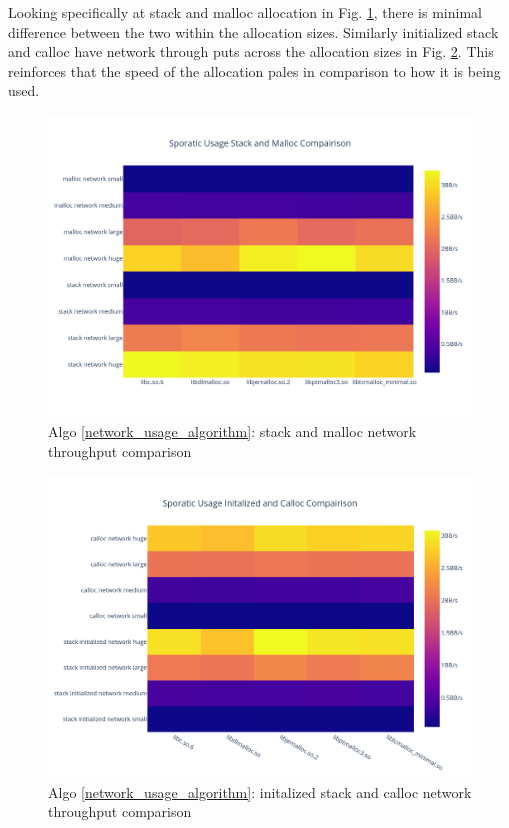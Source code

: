 \documentclass[letterpaper, 10 pt, conference]{ieeeconf}  %
\begin{document}
\pagebreak
Looking specifically at stack and malloc allocation in Fig. \ref{algo3_stack_malloc_hist}, there is minimal difference between the two within the allocation sizes.
Similarly initialized stack and calloc have network through puts across the allocation sizes in Fig. \ref{algo3_init_calloc_hist}.
This reinforces that the speed of the allocation pales in comparison to how it is being used.

\begin{figure}[tbh!]
  \centering
  \includegraphics[width=\columnwidth]{graphs/sporatic_stack_malloc_hist.png}
  \caption{ Algo \ref{network_usage_algorithm}: stack and malloc network throughput comparison }
  \label{algo3_stack_malloc_hist}
\end{figure}

\begin{figure}[tbh!]
  \centering
  \includegraphics[width=\columnwidth]{graphs/sporatic_init_calloc_hist.png}
  \caption{ Algo \ref{network_usage_algorithm}: initalized stack and calloc network throughput comparison }
  \label{algo3_init_calloc_hist}
\end{figure}
\end{document}
